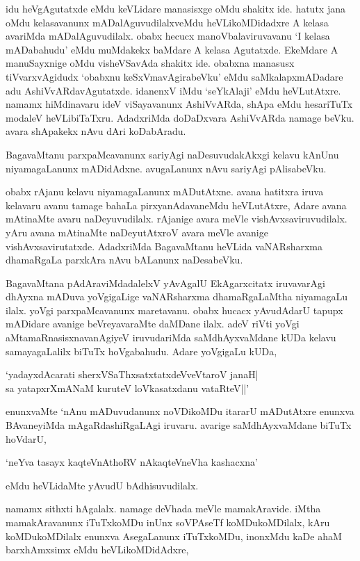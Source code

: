 idu heVgAgutatxde eMdu keVLidare manasisxge oMdu shakitx ide. hatutx jana oMdu kelasavanunx mADalAguvudilalxveMdu heVLikoMDidadxre A kelasa avariMda mADalAguvudilalx. obabx hecucx manoVbalaviruvavanu `I kelasa mADabahudu' eMdu muMdakekx baMdare A kelasa Agutatxde. EkeMdare A manuSayxnige oMdu visheVSavAda shakitx ide. obabxna manasusx tiVvarxvAgidudx `obabxnu keSxVmavAgirabeVku' eMdu saMkalapxmADadare adu AshiVvARdavAgutatxde. idanenxV iMdu `seYkAlaji' eMdu heVLutAtxre. namamx hiMdinavaru ideV viSayavanunx AshiVvARda, shApa eMdu hesariTuTx modaleV heVLibiTaTxru. AdadxriMda doDaDxvara AshiVvARda namage beVku. avara shApakekx nAvu dAri koDabAradu.

BagavaMtanu parxpaMcavanunx sariyAgi naDesuvudakAkxgi kelavu kAnUnu niyamagaLanunx mADidAdxne. avugaLanunx nAvu sariyAgi pAlisabeVku.

obabx rAjanu kelavu niyamagaLanunx mADutAtxne. avana hatitxra iruva kelavaru avanu tamage bahaLa pirxyanAdavaneMdu heVLutAtxre, Adare avana mAtinaMte avaru naDeyuvudilalx. rAjanige avara meVle vishAvxsaviruvudilalx. yAru avana mAtinaMte naDeyutAtxroV avara meVle avanige vishAvxsavirutatxde. AdadxriMda BagavaMtanu heVLida vaNARsharxma dhamaRgaLa parxkAra nAvu bALanunx naDesabeVku.

BagavaMtana pAdAraviMdadalelxV yAvAgalU EkAgarxcitatx iruvavarAgi dhAyxna mADuva yoVgigaLige vaNARsharxma dhamaRgaLaMtha niyamagaLu ilalx. yoVgi parxpaMcavanunx maretavanu. obabx hucacx yAvudAdarU tapupx mADidare avanige beVreyavaraMte daMDane ilalx. adeV riVti yoVgi aMtamaRnasisxnavanAgiyeV iruvudariMda saMdhAyxvaMdane kUDa kelavu samayagaLalilx biTuTx hoVgabahudu. Adare yoVgigaLu kUDa,

\begin{shloka}
`yadayxdAcarati sherxVSaThxsatxtatxdeVveVtaroV janaH|\\
sa yatapxrXmANaM kuruteV loVkasatxdanu vataRteV||'
\end{shloka}

\noindent enunxvaMte `nAnu mADuvudanunx noVDikoMDu itararU mADutAtxre enunxva BAvaneyiMda mAgaRdashiRgaLAgi iruvaru. avarige saMdhAyxvaMdane biTuTx hoVdarU,

\begin{shloka}
`neYva tasayx kaqteVnAthoRV nAkaqteVneVha kashacxna'
\end{shloka}

\noindent eMdu heVLidaMte yAvudU bAdhisuvudilalx.

namamx sithxti hAgalalx. namage deVhada meVle mamakAravide. iMtha mamakAravanunx iTuTxkoMDu inUnx soVPAseTf koMDukoMDilalx, kAru koMDukoMDilalx enunxva AsegaLanunx iTuTxkoMDu, inonxMdu kaDe ahaM barxhAmxsimx eMdu heVLikoMDidAdxre, 

